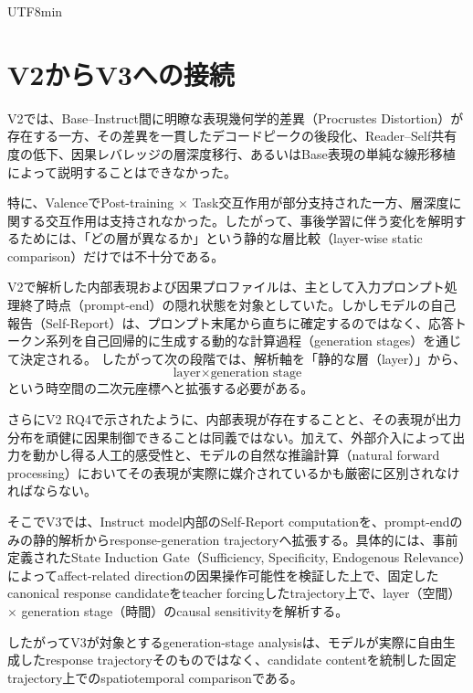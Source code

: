 \documentclass{article} %
\begin{document}
\begin{CJK*}{UTF8}{min}
\section{V2からV3への接続}
\label{sec:v2-to-v3}

V2では、Base--Instruct間に明瞭な表現幾何学的差異（Procrustes Distortion）が存在する一方、その差異を一貫したデコードピークの後段化、Reader--Self共有度の低下、因果レバレッジの層深度移行、あるいはBase表現の単純な線形移植によって説明することはできなかった。

特に、ValenceでPost-training $\times$ Task交互作用が部分支持された一方、層深度に関する交互作用は支持されなかった。したがって、事後学習に伴う変化を解明するためには、「どの層が異なるか」という静的な層比較（layer-wise static comparison）だけでは不十分である。

V2で解析した内部表現および因果プロファイルは、主として入力プロンプト処理終了時点（prompt-end）の隠れ状態を対象としていた。しかしモデルの自己報告（Self-Report）は、プロンプト末尾から直ちに確定するのではなく、応答トークン系列を自己回帰的に生成する動的な計算過程（generation stages）を通じて決定される。
したがって次の段階では、解析軸を「静的な層（layer）」から、
\[
\text{layer} \times \text{generation stage}
\]
という時空間の二次元座標へと拡張する必要がある。

さらにV2 RQ4で示されたように、内部表現が存在することと、その表現が出力分布を頑健に因果制御できることは同義ではない。加えて、外部介入によって出力を動かし得る人工的感受性と、モデルの自然な推論計算（natural forward processing）においてその表現が実際に媒介されているかも厳密に区別されなければならない。

そこでV3では、Instruct model内部のSelf-Report computationを、prompt-endのみの静的解析からresponse-generation trajectoryへ拡張する。具体的には、事前定義されたState Induction Gate（Sufficiency, Specificity, Endogenous Relevance）によってaffect-related directionの因果操作可能性を検証した上で、固定したcanonical response candidateをteacher forcingしたtrajectory上で、layer（空間）\(\times\) generation stage（時間）のcausal sensitivityを解析する。

したがってV3が対象とするgeneration-stage analysisは、モデルが実際に自由生成したresponse trajectoryそのものではなく、candidate contentを統制した固定trajectory上でのspatiotemporal comparisonである。



\end{CJK*}
\end{document}
